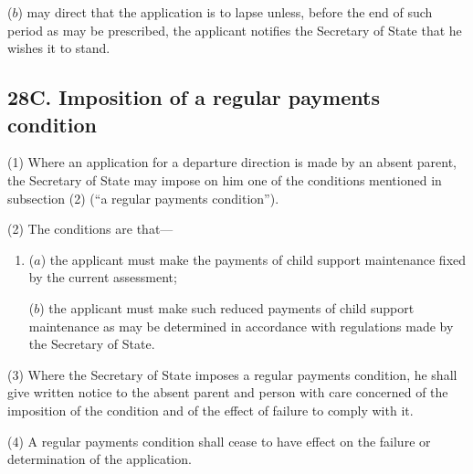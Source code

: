 \documentclass[12pt,a4paper]{article}
\begin{document}
{\begin{enumerate}
($b$) may direct that the application is to lapse unless, before the end of such period as may be prescribed, the applicant notifies the Secretary of State that he wishes it to stand.
\end{enumerate}


\subsection{28C. Imposition of a regular payments condition}

(1) Where an application for a departure direction is made by an absent parent, the Secretary of State may impose on him one of the conditions mentioned in subsection (2) (“a regular payments condition”).

(2) The conditions are that---
\begin{enumerate}\item[]
($a$) the applicant must make the payments of child support maintenance fixed by the current assessment;

($b$) the applicant must make such reduced payments of child support maintenance as may be determined in accordance with regulations made by the Secretary of State.
\end{enumerate}

(3)
Where the Secretary of State imposes a regular payments condition, he shall give written notice to the absent parent and person with care concerned of the imposition of the condition and of the effect of failure to comply with it.

(4)
A regular payments condition shall cease to have effect on the failure or determination of the application.

}
\end{document}
